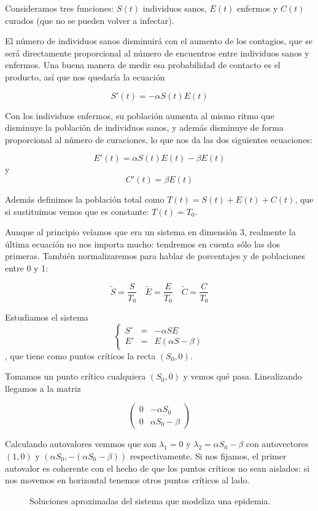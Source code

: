 Consideramos tres funciones: $S(t)$ individuos sanos, $E(t)$ enfermos y $C(t)$ curados (que no se pueden volver a infectar). 

El número de individuos sanos disminuirá con el aumento de los contagios, que se será directamente proporcional al número de encuentros entre individuos sanos y enfermos. Una buena manera de medir esa probabilidad de contacto es el producto, así que nos quedaría la ecuación

\[ S'(t) = -αS(t) E(t) \]

Con los individuos enfermos, su población aumenta al mismo ritmo que disminuye la población de individuos sanos, y además disminuye de forma proporcional al número de curaciones, lo que nos da las dos siguientes ecuaciones:

\[ E'(t) = α S(t) E(t) - βE(t) \] y \[ C'(t) = βE(t) \]

Además definimos la población total como $T(t) = S(t) + E(t) + C(t)$, que si sustituimos vemos que es constante: $T(t) = T_0$.

Aunque al principio veíamos que era un sistema en dimensión 3, realmente la última ecuación no nos importa mucho: tendremos en cuenta sólo las dos primeras. También normalizaremos para hablar de porcentajes y de poblaciones entre 0 y 1:

\[ \tilde{S} = \frac{S}{T_0} \quad \tilde{E} = \frac{E}{T_0} \quad \tilde{C} = \frac{C}{T_0} \]

Estudiamos el sistema \[ \left\{\begin{array}{rcl} S' &=& -αSE \\ E' &=& E(αS - β) \end{array}\right. \], que tiene como puntos críticos la recta $(S_0, 0)$.

Tomamos un punto crítico cualquiera $(S_0,0)$ y vemos qué pasa. Linealizando llegamos a la matriz

\[ \begin{pmatrix}
0 & -αS_0 \\ 0 & αS_0 -β
\end{pmatrix} \]

Calculando autovalores vemmos que son $λ_1 = 0$ y $λ_2 = αS_0 - β$ con autovectores $(1,0)$ y $(αS_0, -(αS_0 - β))$ respectivamente. Si nos fijamos, el primer autovalor es coherente con el hecho de que los puntos críticos no sean aislados: si nos movemos en horizontal tenemos otros puntos críticos al lado.

\begin{figure}[hbtp]
\centering
{}
\label{img8-Epidemia}
\caption{Soluciones aproximadas del sistema que modeliza una epidemia.}
\end{figure}


